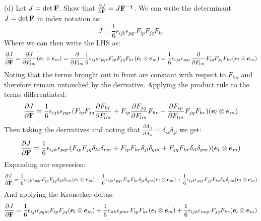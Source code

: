 \medskip
(d) Let $J = \det \mathbf{F}$. Show that $\frac{\partial J}{\partial \mathbf{F}} = J \mathbf{F}^{-\intercal}$. \newline
We can write the determinant $J = \det \mathbf{F}$ in index notation as:
\begin{equation}
    J = \frac{1}{6}\epsilon_{ijk}\epsilon_{pqr}F_{ip}F_{jq}F_{kr}
\end{equation}
Where we can then write the LHS as:
\begin{equation}
    \frac{\partial J}{\partial \mathbf{F}} = \frac{\partial J}{\partial F_{lm}}(\bm{e}_l \otimes \bm{e}_m) = \frac{\partial}{\partial F_{lm}}\frac{1}{6}\epsilon_{ijk}\epsilon_{pqr}F_{ip}F_{jq}F_{kr}(\bm{e}_l \otimes \bm{e}_m) = \frac{1}{6}\epsilon_{ijk}\epsilon_{pqr}\frac{\partial}{\partial F_{lm}}F_{ip}F_{jq}F_{kr}(\bm{e}_l \otimes \bm{e}_m)
\end{equation}
Noting that the terms brought out in front are constant with respect to $F_{lm}$ and therefore remain untouched by the derivative. Applying the product rule to the terms differentiated:
\begin{equation}
    \frac{\partial J}{\partial \mathbf{F}} = \frac{1}{6}\epsilon_{ijk}\epsilon_{pqr} (F_{ip}F_{jq}\frac{\partial F_{kr}}{\partial F_{lm}} + F_{ip}\frac{\partial F_{jq}}{\partial F_{lm}}F_{kr} + \frac{\partial F_{ip}}{\partial F_{lm}}F_{jq}F_{kr}) (\bm{e}_l \otimes \bm{e}_m)
\end{equation}
Then taking the derivatives and noting that $\frac{\partial A_{ij}}{\partial A_{kl}} = \delta_{ik}\delta_{jl}$ we get:
\begin{equation}
    \frac{\partial J}{\partial \mathbf{F}} = \frac{1}{6}\epsilon_{ijk}\epsilon_{pqr} (F_{ip}F_{jq}\delta_{kl}\delta_{rm} + F_{ip}F_{kr}\delta_{jl}\delta_{qm} + F_{jq}F_{kr}\delta_{il}\delta_{pm}) (\bm{e}_l \otimes \bm{e}_m)
\end{equation}
Expanding our expression:
\begin{equation}
    \frac{\partial J}{\partial \mathbf{F}} = \frac{1}{6}\epsilon_{ijk}\epsilon_{pqr}F_{ip}F_{jq}\delta_{kl}\delta_{rm}(\bm{e}_l \otimes \bm{e}_m) + \frac{1}{6}\epsilon_{ijk}\epsilon_{pqr}F_{ip}F_{kr}\delta_{jl}\delta_{qm}(\bm{e}_l \otimes \bm{e}_m) + \frac{1}{6}\epsilon_{ijk}\epsilon_{pqr}F_{jq}F_{kr}\delta_{il}\delta_{pm}(\bm{e}_l \otimes \bm{e}_m)
\end{equation}
And applying the Kronecker deltas:
\begin{equation}
    \frac{\partial J}{\partial \mathbf{F}} = \frac{1}{6}\epsilon_{ijl}\epsilon_{pqm}F_{ip}F_{jq}(\bm{e}_l \otimes \bm{e}_m) + \frac{1}{6}\epsilon_{ilk}\epsilon_{pmr}F_{ip}F_{kr}(\bm{e}_l \otimes \bm{e}_m) + \frac{1}{6}\epsilon_{ljk}\epsilon_{mqr}F_{jq}F_{kr}(\bm{e}_l \otimes \bm{e}_m)
\end{equation}
